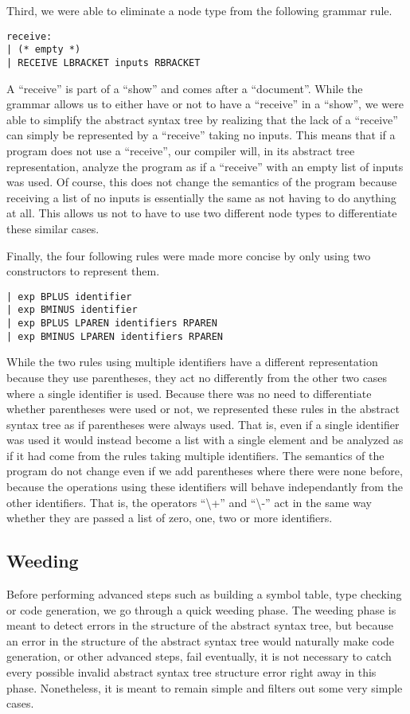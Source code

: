 \documentclass{WigReport}
\begin{document}
Third, we were able to eliminate a node type from the following grammar rule.
\begin{verbatim}
receive:
| (* empty *)
| RECEIVE LBRACKET inputs RBRACKET
\end{verbatim}
A ``receive'' is part of a ``show'' and comes after a ``document''. While the grammar allows us to either have or not to have a ``receive'' in a ``show'', we were able to simplify the abstract syntax tree by realizing that the lack of a ``receive'' can simply be represented by a ``receive'' taking no inputs. This means that if a program does not use a ``receive'', our compiler will, in its abstract tree representation, analyze the program as if a ``receive'' with an empty list of inputs was used. Of course, this does not change the semantics of the program because receiving a list of no inputs is essentially the same as not having to do anything at all. This allows us not to have to use two different node types to differentiate these similar cases. 

Finally, the four following rules were made more concise by only using two constructors to represent them.
\begin{verbatim}
| exp BPLUS identifier
| exp BMINUS identifier
| exp BPLUS LPAREN identifiers RPAREN
| exp BMINUS LPAREN identifiers RPAREN
\end{verbatim}
While the two rules using multiple identifiers have a different representation because they use parentheses, they act no differently from the other two cases where a single identifier is used. Because there was no need to differentiate whether parentheses were used or not, we represented these rules in the abstract syntax tree as if parentheses were always used. That is, even if a single identifier was used it would instead become a list with a single element and be analyzed as if it had come from the rules taking multiple identifiers. The semantics of the program do not change even if we add parentheses where there were none before, because the operations using these identifiers will behave independantly from the other identifiers. That is, the operators ``\textbackslash+'' and ``\textbackslash-'' act in the same way whether they are passed a list of zero, one, two or more identifiers. 

\subsection{Weeding}
Before performing advanced steps such as building a symbol table, type checking or code generation, we go through a quick weeding phase. The weeding phase is meant to detect errors in the structure of the abstract syntax tree, but because an error in the structure of the abstract syntax tree would naturally make code generation, or other advanced steps, fail eventually, it is not necessary to catch every possible invalid abstract syntax tree structure error right away in this phase. Nonetheless, it is meant to remain simple and filters out some very simple cases.
\end{document}
